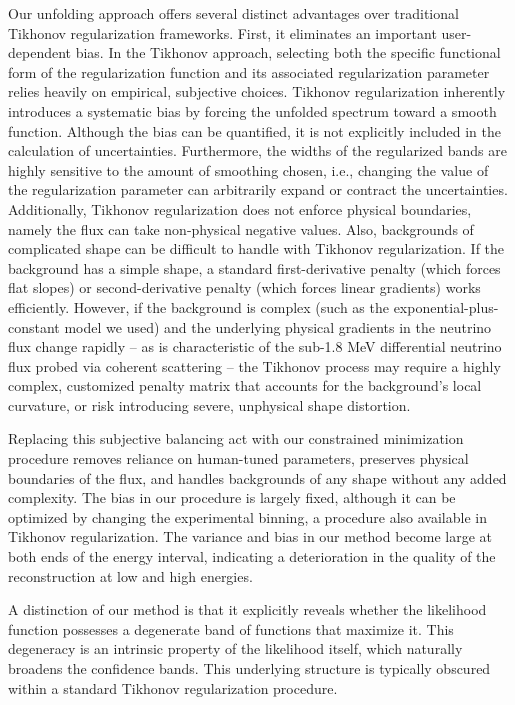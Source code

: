\documentclass[a4paper,11pt]{article}
\renewcommand\({\left(}
\renewcommand\){\right)}
\renewcommand\[{\left[}
\renewcommand\]{\right]}
\theoremstyle{definition}
\begin{document}
Our unfolding approach offers several distinct advantages over traditional Tikhonov regularization frameworks. First, it eliminates an important user-dependent bias. In the Tikhonov approach, selecting both the specific functional form of the regularization function and its associated regularization parameter relies heavily on empirical, subjective choices. 
Tikhonov regularization inherently introduces a systematic bias by forcing the unfolded spectrum toward a smooth function. Although the bias can be quantified, it is not explicitly included in the calculation of uncertainties. Furthermore,  the widths of the regularized bands are highly sensitive to the amount of smoothing chosen, i.e., changing the value of the regularization parameter can arbitrarily expand or contract the uncertainties. Additionally, Tikhonov regularization does not enforce physical boundaries, namely the flux can take non-physical negative values. Also, backgrounds of complicated shape can be difficult to handle with Tikhonov regularization.  If the background has a simple shape,  a standard first-derivative penalty (which forces flat slopes) or second-derivative penalty (which forces linear gradients) works efficiently. However, if the background is complex (such as the 
exponential-plus-constant model we used) and the underlying physical gradients in the neutrino flux change rapidly -- as is characteristic of the sub-1.8 MeV differential neutrino flux probed via coherent scattering -- the Tikhonov process may require a highly complex, customized penalty matrix that accounts for the background's local curvature, or risk introducing severe, unphysical shape distortion. 

Replacing this subjective balancing act with our constrained minimization procedure removes reliance on human-tuned parameters, preserves physical boundaries of the flux, and handles backgrounds of any shape without any added complexity. The bias in our procedure is largely fixed, although it can be optimized by changing the experimental binning, a procedure also available in Tikhonov regularization. The variance and bias in our method become large at both ends of the energy interval, indicating a deterioration in the quality of the reconstruction at low and high energies.


A distinction of our method is that it explicitly reveals whether the likelihood function possesses a degenerate band of functions that maximize it. This degeneracy is an intrinsic property of the likelihood itself, which naturally broadens the confidence bands. This underlying structure is typically obscured within a standard Tikhonov regularization procedure.
\end{document}
